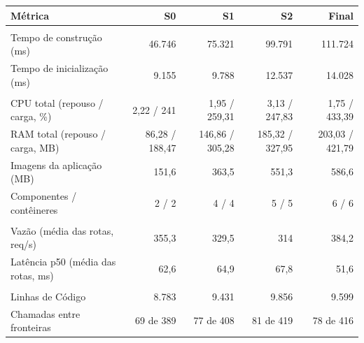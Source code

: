 \begin{quadro}[htb]
  \centering
  \caption{Inventário --- métricas por snapshot --- Transações.}
  \label{qua:comp_inventory-api_transacoes_snapshots}
  \renewcommand{\arraystretch}{1.15}
  \begin{tabularx}{\textwidth}{|>{\raggedright\arraybackslash}X|r|r|r|r|}
    \hline
    \textbf{Métrica} & \textbf{S0} & \textbf{S1} & \textbf{S2} & \textbf{Final} \\ \hline
    \multicolumn{5}{|l|}{\textbf{Agilidade}} \\ \hline
    Tempo de construção (ms) & 46.746 & 75.321 & 99.791 & 111.724 \\
    Tempo de inicialização (ms) & 9.155 & 9.788 & 12.537 & 14.028 \\ \hline
    \multicolumn{5}{|l|}{\textbf{Custo}} \\ \hline
    CPU total (repouso / carga, \%) & 2,22 / 241 & 1,95 / 259,31 & 3,13 / 247,83 & 1,75 / 433,39 \\
    RAM total (repouso / carga, MB) & 86,28 / 188,47 & 146,86 / 305,28 & 185,32 / 327,95 & 203,03 / 421,79 \\
    Imagens da aplicação (MB) & 151,6 & 363,5 & 551,3 & 586,6 \\
    Componentes / contêineres & 2 / 2 & 4 / 4 & 5 / 5 & 6 / 6 \\ \hline
    \multicolumn{5}{|l|}{\textbf{Desempenho}} \\ \hline
    Vazão (média das rotas, req/s) & 355,3 & 329,5 & 314 & 384,2 \\
    Latência p50 (média das rotas, ms) & 62,6 & 64,9 & 67,8 & 51,6 \\ \hline
    \multicolumn{5}{|l|}{\textbf{Manutenibilidade}} \\ \hline
    Linhas de Código & 8.783 & 9.431 & 9.856 & 9.599 \\
    Chamadas entre fronteiras & 69 de 389 & 77 de 408 & 81 de 419 & 78 de 416 \\ \hline
  \end{tabularx}
\end{quadro}
